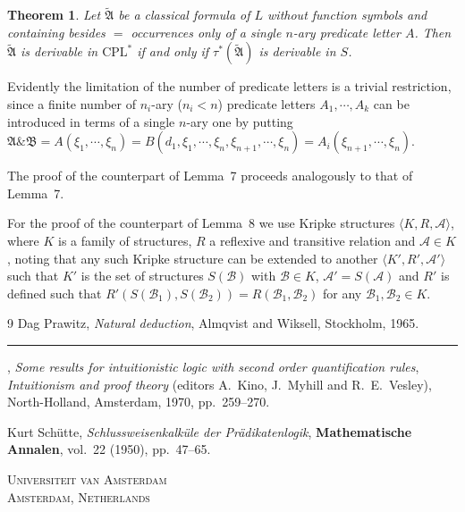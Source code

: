 \documentclass[12pt,a4paper]{article}
\newtheorem{theorem}[lemma]{Theorem}
\begin{document}
\begin{theorem}
Let $\tilde{\mathfrak{A}}$ be a classical formula of $L$ without function
symbols and containing besides $=$ occurrences only of a single $n$-ary
predicate letter $A$. Then $\tilde{\mathfrak{A}}$ is derivable in
$\mathrm{CPL}^*$ if and only if $\tau^*(\tilde{\mathfrak{A}})$ is derivable
in $S$.
\end{theorem}

Evidently the limitation of the number of predicate letters is a trivial
restriction, since a finite number of $n_i$-ary ($n_i < n$) predicate letters
$A_1, \cdots, A_k$ can be introduced in terms of a single $n$-ary one by
putting $\mathfrak{A} \mathbin{\&} \mathfrak{B} = A(\xi_1, \cdots, \xi_n) =
B(d_1, \xi_1, \cdots, \xi_n, \xi_{n+1}, \cdots, \xi_n) =
A_i(\xi_{n+1}, \cdots, \xi_n)$.

\bigskip\noindent
The proof of the counterpart of Lemma~7 proceeds analogously to that of
Lemma~7.

For the proof of the counterpart of Lemma~8 we use Kripke structures
$\langle K, R, \mathscr{A}\rangle$, where $K$ is a family of structures, $R$
a reflexive and transitive relation and $\mathscr{A} \in K$, noting that any
such Kripke structure can be extended to another
$\langle K', R', \mathscr{A}'\rangle$ such that $K'$ is the set of structures
$S(\mathscr{B})$ with $\mathscr{B} \in K$, $\mathscr{A}' = S(\mathscr{A})$
and $R'$ is defined such that $R'(S(\mathscr{B}_1), S(\mathscr{B}_2)) =
R(\mathscr{B}_1, \mathscr{B}_2)$ for any $\mathscr{B}_1, \mathscr{B}_2 \in K$.

\begin{thebibliography}{9}
  Dag Prawitz,
  \textit{Natural deduction},
  Almqvist and Wiksell, Stockholm, 1965.

  \rule{2em}{0.4pt},
  \textit{Some results for intuitionistic logic with second order
  quantification rules},
  \textit{Intuitionism and proof theory} (editors A.~Kino, J.~Myhill and
  R.~E.~Vesley),
  North-Holland, Amsterdam, 1970, pp.~259--270.

  Kurt Sch\"{u}tte,
  \textit{Schlussweisenkalk\"{u}le der Pr\"{a}dikatenlogik},
  \textbf{Mathematische Annalen}, vol.~22 (1950), pp.~47--65.
\end{thebibliography}

\bigskip
\begin{center}
  \textsc{Universiteit van Amsterdam}\\
  \textsc{Amsterdam, Netherlands}
\end{center}
\end{document}
